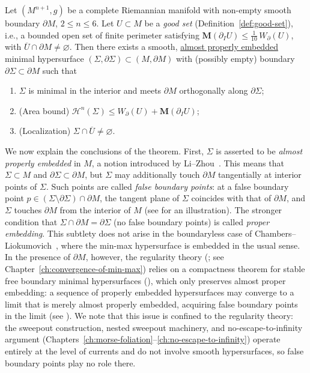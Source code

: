 \begin{theorem}\label{thm:main}
Let $(M^{n+1}, g)$ be a complete Riemannian manifold with non-empty smooth boundary $\partial M$, $2 \leq n \leq 6$.  Let $U \subset M$ be a \emph{good set} (Definition~\ref{def:good-set}), i.e., a bounded open set of finite perimeter satisfying $\mathbf{M}(\partial_I U) \leq \frac{1}{10}\, W_\partial(U)$, with $\overline{U} \cap \partial M \neq \varnothing$.  Then there exists a smooth, \underline{almost properly embedded} minimal hypersurface $(\Sigma,\partial\Sigma)\subset(M,\partial M)$ with (possibly empty) boundary $\partial\Sigma\subset\partial M$ such that
\begin{enumerate}[label=\textup{(\roman*)}]
    \item $\Sigma$ is minimal in the interior and meets $\partial M$ orthogonally along $\partial\Sigma$;
    \item \textup{(Area bound)} $\mathcal{H}^n(\Sigma)\le W_\partial(U)+\mathbf{M}(\partial_IU)$;
    \item \textup{(Localization)} $\Sigma\cap\overline{U}\neq\varnothing$.
\end{enumerate}
\end{theorem}

We now explain the conclusions of the theorem. First, $\Sigma$ is asserted to be \emph{almost properly embedded} in $M$, a notion introduced by Li--Zhou~\cite{LZ17}. This means that $\Sigma \subset M$ and $\partial\Sigma \subset \partial M$, but $\Sigma$ may additionally touch $\partial M$ tangentially at interior points of $\Sigma$. Such points are called \emph{false boundary points}: at a false boundary point $p \in (\Sigma \setminus \partial\Sigma) \cap \partial M$, the tangent plane of $\Sigma$ coincides with that of $\partial M$, and $\Sigma$ touches $\partial M$ from the interior of $M$ (see \cite[Figure~1]{LZ17} for an illustration). The stronger condition that $\Sigma \cap \partial M = \partial\Sigma$ (no false boundary points) is called \emph{proper embedding}. This subtlety does not arise in the boundaryless case of Chambers--Liokumovich~\cite{CL20}, where the min-max hypersurface is embedded in the usual sense. In the presence of $\partial M$, however, the regularity theory (\cite[Theorem~6.2]{LZ17}; see Chapter~\ref{ch:convergence-of-min-max}) relies on a compactness theorem for stable free boundary minimal hypersurfaces (\cite[Theorem~2.13]{LZ17}), which only preserves almost proper embedding: a sequence of properly embedded hypersurfaces may converge to a limit that is merely almost properly embedded, acquiring false boundary points in the limit (see \cite[Figure~2]{LZ17}). We note that this issue is confined to the regularity theory: the sweepout construction, nested sweepout machinery, and no-escape-to-infinity argument (Chapters~\ref{ch:morse-foliation}--\ref{ch:no-escape-to-infinity}) operate entirely at the level of currents and do not involve smooth hypersurfaces, so false boundary points play no role there.


